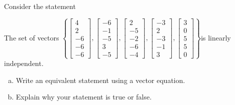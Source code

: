 
\begin{exerciseStatement}


Consider the statement 
\begin{center}\begin{minipage}{0.8\textwidth}
 The set of vectors \( \left\{ \left[\begin{array}{c}
4 \\
2 \\
-6 \\
-6 \\
-6
\end{array}\right] , \left[\begin{array}{c}
-6 \\
-1 \\
-5 \\
3 \\
-5
\end{array}\right] , \left[\begin{array}{c}
2 \\
-5 \\
-2 \\
-6 \\
-4
\end{array}\right] , \left[\begin{array}{c}
-3 \\
2 \\
-3 \\
-1 \\
3
\end{array}\right] , \left[\begin{array}{c}
3 \\
0 \\
5 \\
5 \\
0
\end{array}\right] \right\} \)is linearly independent.
\end{minipage}\end{center}
    


\begin{enumerate}[(a)]
\item  Write an equivalent statement using a vector equation.
\item  Explain why your statement is true or false.
\end{enumerate}
    
\end{exerciseStatement}
    
